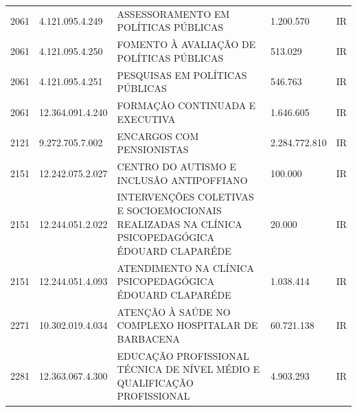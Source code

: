 \documentclass{article}
\begin{document}
\begin{longtable}[c]{m{1cm}|m{2cm}|m{10cm}|m{2cm}|m{1cm}}
\multicolumn{1}{C{1cm}|}{2061} & \multicolumn{1}{C{2cm}|}{4.121.095.4.249} & \multicolumn{1}{L{10cm}|}{ASSESSORAMENTO EM POLÍTICAS PÚBLICAS} & \multicolumn{1}{R{2cm}|}{1.200.570} & \multicolumn{1}{C{1cm}}{IR} \\
\multicolumn{1}{C{1cm}|}{2061} & \multicolumn{1}{C{2cm}|}{4.121.095.4.250} & \multicolumn{1}{L{10cm}|}{FOMENTO À AVALIAÇÃO DE POLÍTICAS PÚBLICAS} & \multicolumn{1}{R{2cm}|}{513.029} & \multicolumn{1}{C{1cm}}{IR} \\
\multicolumn{1}{C{1cm}|}{2061} & \multicolumn{1}{C{2cm}|}{4.121.095.4.251} & \multicolumn{1}{L{10cm}|}{PESQUISAS EM POLÍTICAS PÚBLICAS} & \multicolumn{1}{R{2cm}|}{546.763} & \multicolumn{1}{C{1cm}}{IR} \\
\multicolumn{1}{C{1cm}|}{2061} & \multicolumn{1}{C{2cm}|}{12.364.091.4.240} & \multicolumn{1}{L{10cm}|}{FORMAÇÃO CONTINUADA E EXECUTIVA} & \multicolumn{1}{R{2cm}|}{1.646.605} & \multicolumn{1}{C{1cm}}{IR} \\
\multicolumn{1}{C{1cm}|}{2121} & \multicolumn{1}{C{2cm}|}{9.272.705.7.002} & \multicolumn{1}{L{10cm}|}{ENCARGOS COM PENSIONISTAS} & \multicolumn{1}{R{2cm}|}{2.284.772.810} & \multicolumn{1}{C{1cm}}{IR} \\
\multicolumn{1}{C{1cm}|}{2151} & \multicolumn{1}{C{2cm}|}{12.242.075.2.027} & \multicolumn{1}{L{10cm}|}{CENTRO DO AUTISMO E INCLUSÃO ANTIPOFFIANO} & \multicolumn{1}{R{2cm}|}{100.000} & \multicolumn{1}{C{1cm}}{IR} \\
\multicolumn{1}{C{1cm}|}{2151} & \multicolumn{1}{C{2cm}|}{12.244.051.2.022} & \multicolumn{1}{L{10cm}|}{INTERVENÇÕES COLETIVAS E SOCIOEMOCIONAIS REALIZADAS NA CLÍNICA PSICOPEDAGÓGICA ÉDOUARD CLAPARÉDE} & \multicolumn{1}{R{2cm}|}{20.000} & \multicolumn{1}{C{1cm}}{IR} \\
\multicolumn{1}{C{1cm}|}{2151} & \multicolumn{1}{C{2cm}|}{12.244.051.4.093} & \multicolumn{1}{L{10cm}|}{ATENDIMENTO NA CLÍNICA PSICOPEDAGÓGICA ÉDOUARD CLAPARÉDE} & \multicolumn{1}{R{2cm}|}{1.038.414} & \multicolumn{1}{C{1cm}}{IR} \\
\multicolumn{1}{C{1cm}|}{2271} & \multicolumn{1}{C{2cm}|}{10.302.019.4.034} & \multicolumn{1}{L{10cm}|}{ATENÇÃO À SAÚDE NO COMPLEXO HOSPITALAR DE BARBACENA} & \multicolumn{1}{R{2cm}|}{60.721.138} & \multicolumn{1}{C{1cm}}{IR} \\
\multicolumn{1}{C{1cm}|}{2281} & \multicolumn{1}{C{2cm}|}{12.363.067.4.300} & \multicolumn{1}{L{10cm}|}{EDUCAÇÃO PROFISSIONAL TÉCNICA DE NÍVEL MÉDIO E QUALIFICAÇÃO PROFISSIONAL} & \multicolumn{1}{R{2cm}|}{4.903.293} & \multicolumn{1}{C{1cm}}{IR} \\

\end{longtable}
\end{document}
